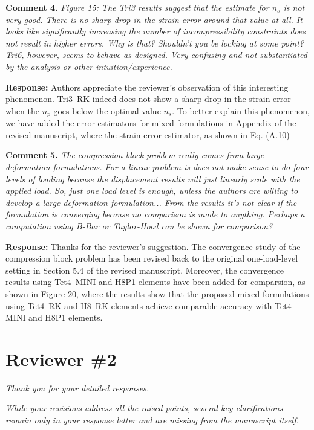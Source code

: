 \documentclass{article}
\begin{document}
\textbf{Comment 4.} \textit{
Figure 15:
The Tri3 results suggest that the estimate for $n_s$ is not very good. There is no sharp drop in the strain error around that value at all.
It looks like significantly increasing the number of incompressibility constraints does not result in higher errors.
Why is that? Shouldn't you be locking at some point? Tri6, however, seems to behave as designed. Very confusing and not substantiated by the analysis or other intuition/experience.
}

\textbf{Response:}
Authors appreciate the reviewer's observation of this interesting phenomenon.
Tri3--RK indeed does not show a sharp drop in the strain error when the $n_p$ goes below the optimal value $n_s$.
To better explain this phenomenon, we have added the error estimators for mixed formulations in Appendix of the revised manuscript,
where the strain error estimator, as shown in Eq. (A.10) 

\textbf{Comment 5.} \textit{The compression block problem really comes from large-deformation formulations. For a linear problem is does not make sense to do four levels of loading because the displacement results will just linearly scale with the applied load. So, just one load level is enough, unless the authors are willing to develop a large-deformation formulation... From the results it's not clear if the formulation is converging because no comparison is made to anything. Perhaps a computation using B-Bar or Taylor-Hood can be shown for comparison?}

\textbf{Response:} 
Thanks for the reviewer's suggestion. The convergence study of the compression block problem has been revised back to the original one-load-level setting in Section 5.4 of the revised manuscript.
Moreover, the convergence results using Tet4--MINI and H8P1 elements have been added for comparsion, as shown in Figure 20,
where the results show that the proposed mixed formulations using Tet4--RK and H8--RK elements achieve comparable accuracy with Tet4--MINI and H8P1 elements.

\section*{Reviewer \#2}

\textit{Thank you for your detailed responses.}

\textit{While your revisions address all the raised points, several key clarifications remain only in your response letter and are missing from the manuscript itself.}
\end{document}
